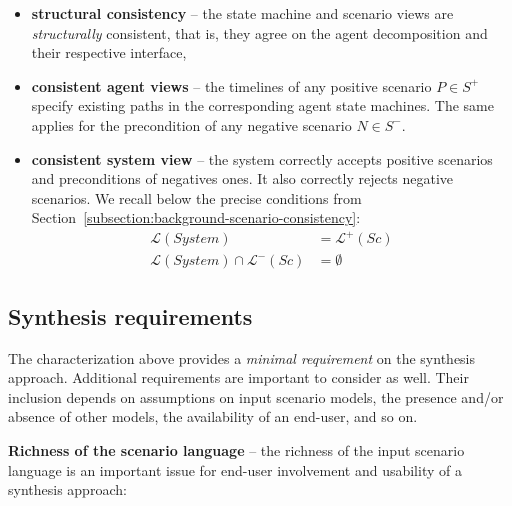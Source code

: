 \begin{itemize}
\item \textbf{structural consistency} -- the state machine and scenario views are \emph{structurally} consistent, that is, they agree on the agent decomposition and their respective interface,
\item \textbf{consistent agent views} -- the timelines of any positive scenario $P \in S^+$ specify existing paths in the corresponding agent state machines. The same applies for the precondition of any negative scenario $N \in S^-$.
\item \textbf{consistent system view} -- the system correctly accepts positive scenarios and preconditions of negatives ones. It also correctly rejects negative scenarios. We recall below the precise conditions from Section~\ref{subsection:background-scenario-consistency}:
\begin{align*}
\mathcal{L}(System) &= \mathcal{L}^+(Sc)\\
\mathcal{L}(System) \cap \mathcal{L}^-(Sc) &= \emptyset
\end{align*}

\end{itemize}


\subsection{Synthesis requirements\label{subsection:inductive-synthesis-requirements}}

The characterization above provides a \emph{minimal requirement} on the synthesis approach. Additional requirements are important to consider as well. Their inclusion depends on assumptions on input scenario models, the presence and/or absence of other models, the availability of an end-user, and so on.

\noindent \textbf{Richness of the scenario language} -- the richness of the input scenario language is an important issue for end-user involvement and usability of a synthesis approach:

